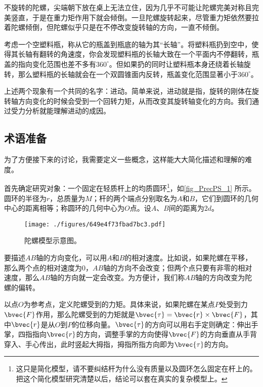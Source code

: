 

不旋转的陀螺，尖端朝下放在桌上无法立住，因为几乎不可能让陀螺完美对称且完美竖直，于是在重力矩作用下就会倾倒。一旦陀螺旋转起来，尽管重力矩依然要拉着陀螺倾倒，但陀螺似乎只是在不停改变旋转轴的方向，一直不倾倒。

考虑一个空塑料瓶，称从它的瓶盖到瓶底的轴为其“长轴”。将塑料瓶扔到空中，使得其长轴有翻转的角速度，你会发现塑料瓶的长轴大致在一个平面内不停翻转，瓶盖的指向变化范围也差不多有$360^\circ$。但如果扔的同时让塑料瓶本身还绕着长轴旋转，那么塑料瓶的长轴就会在一个双圆锥面内反转，瓶盖变化范围显著小于$360^\circ$。

上述两个现象有一个共同的名字：进动。简单来说，进动就是指，旋转的刚体在旋转轴方向变化的时候会受到一个回转力矩，从而改变其旋转轴变化的方向。我们通过受力分析就能理解进动的成因。


\subsection{术语准备}


为了方便接下来的讨论，我需要定义一些概念，这样能大大简化描述和理解的难度。


首先确定研究对象：一个固定在轻质杆上的均质圆环\footnote{这只是简化模型，请不要纠结杆为什么没有质量以及圆环怎么固定在杆上的。把这个简化模型研究清楚以后，结论可以套在真实的复杂模型上。}，如\autoref{fig_PrecPS_1} 所示。圆环的半径为$r$，总质量为$M$；杆的两个端点分别取名为$A$和$B$，它们到圆环的几何中心的距离相等；称圆环的几何中心为$O$点。设$A$、$B$间的距离为$2d$。

\begin{figure}[ht]
\centering
\texttt{[image: ./figures/649e4f73fbad7bc3.pdf]}
\caption{陀螺模型示意图。} \label{fig_PrecPS_1}
\end{figure}


要描述$AB$轴的方向变化，可以用$A$和$B$的相对速度。比如说，如果陀螺在平移，那么两个点的相对速度为$0$，$AB$轴的方向不会改变；但两个点只要有非零的相对速度，那么$AB$轴的方向就一定会改变。为方便计，我们称$AB$轴的方向改变为陀螺的偏转。


以点$O$为参考点，定义陀螺受到的力矩。具体来说，如果陀螺在某点$P$处受到力$\bvec{F}$作用，那么陀螺受到的力矩就是$\bvec{\tau}=\bvec{r}\times \bvec{F}$，其中$\bvec{r}$是从$O$到$P$的位移向量。$\bvec{\tau}$的方向可以用右手定则确定：伸出手掌，四指指向$\bvec{r}$的方向，调整手掌的方向使得$\bvec{F}$的方向垂直从手背穿入、手心传出，此时竖起大拇指，拇指所指方向即为$\bvec{\tau}$的方向。


